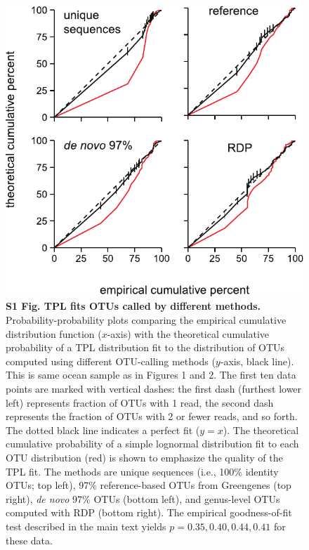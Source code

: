 \clearpage
\begin{figure}[ht]
\centering
\includegraphics{texmex/fig/fig_s1}
\caption*{{\bf S1 Fig. TPL fits OTUs called by different methods.}
Probability-probability plots
comparing the empirical cumulative distribution function ($x$-axis) with the
theoretical cumulative probability of a TPL distribution fit to the
distribution of OTUs computed using different OTU-calling methods ($y$-axis,
black line). This is same ocean sample as in Figures 1 and 2. The first ten
data points are marked with vertical dashes: the first dash (furthest lower
left) represents fraction of OTUs with 1 read, the second dash represents the
fraction of OTUs with 2 or fewer reads, and so forth. The dotted black line
indicates a perfect fit ($y = x$). The theoretical cumulative probability of a
simple lognormal distribution fit to each OTU distribution (red) is shown to
emphasize the quality of the TPL fit. The methods are unique sequences (i.e.,
100\% identity OTUs; top left), 97\% reference-based OTUs from Greengenes (top
right), \textit{de novo} 97\% OTUs (bottom left), and genus-level OTUs computed with RDP
(bottom right). The empirical goodness-of-fit test described in the main text
yields $p = 0.35, 0.40, 0.44, 0.41$ for these data.}
\end{figure}

